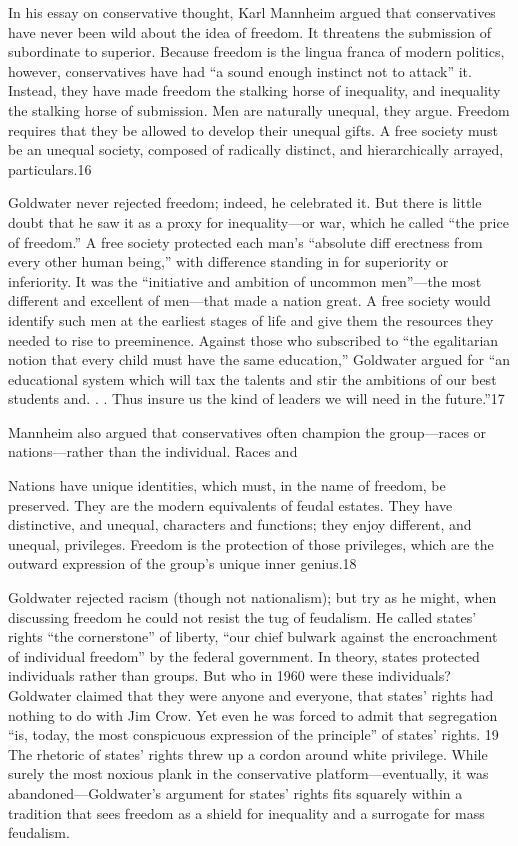  \par 
In his essay on conservative thought, Karl Mannheim argued that conservatives have never been wild about the idea of freedom. It threatens the submission of subordinate to superior. Because freedom is the lingua franca of modern politics, however, conservatives have had “a sound enough instinct not to attack” it. Instead, they have made freedom the stalking horse of inequality, and inequality the stalking horse of submission. Men are naturally unequal, they argue. Freedom requires that they be allowed to develop their unequal gifts. A free society must be an unequal society, composed of radically distinct, and hierarchically arrayed, particulars.{\color{blue}16}
 \par 
Goldwater never rejected freedom; indeed, he celebrated it. But there is little doubt that he saw it as a proxy for inequality—or war, which he called “the price of freedom.” A free society protected each man’s “absolute diff erectness from every other human being,” with difference standing in for superiority or inferiority. It was the “initiative and ambition of uncommon men”—the most different and excellent of men—that made a nation great. A free society would identify such men at the earliest stages of life and give them the resources they needed to rise to preeminence. Against those who subscribed to “the egalitarian notion that every child must have the same education,” Goldwater argued for “an educational system which will tax the talents and stir the ambitions of our best students and. . . Thus insure us the kind of leaders we will need in the future.”{\color{blue}17}
 \par 
Mannheim also argued that conservatives often champion the group—races or nations—rather than the individual. Races and
 \par 
Nations have unique identities, which must, in the name of freedom, be preserved. They are the modern equivalents of feudal estates. They have distinctive, and unequal, characters and functions; they enjoy different, and unequal, privileges. Freedom is the protection of those privileges, which are the outward expression of the group’s unique inner genius.{\color{blue}18}
 \par 
Goldwater rejected racism (though not nationalism); but try as he might, when discussing freedom he could not resist the tug of feudalism. He called states’ rights “the cornerstone” of liberty, “our chief bulwark against the encroachment of individual freedom” by the federal government. In theory, states protected individuals rather than groups. But who in 1960 were these individuals? Goldwater claimed that they were anyone and everyone, that states’ rights had nothing to do with Jim Crow. Yet even he was forced to admit that segregation “is, today, the most conspicuous expression of the principle” of states’ rights. {\color{blue}19} The rhetoric of states’ rights threw up a cordon around white privilege. While surely the most noxious plank in the conservative platform—eventually, it was abandoned—Goldwater’s argument for states’ rights fits squarely within a tradition that sees freedom as a shield for inequality and a surrogate for mass feudalism.
